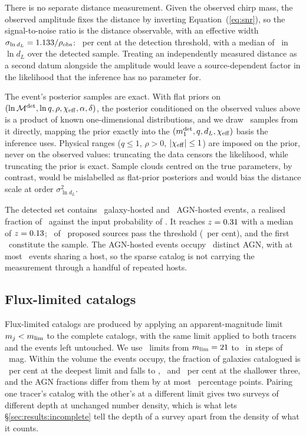 There is no separate distance measurement. Given the observed chirp mass, the
observed amplitude fixes the distance by inverting Equation~(\ref{eq:snr}), so
the signal-to-noise ratio is the distance observable, with an effective width
$\sigma_{\ln d_L} = 1.133/\rho_{\rm obs}$: \EvSigmaLnDlThresh\
per cent at the detection threshold, with a median of \EvSigmaLnDlMedian\ in
$\ln d_L$ over the detected sample. Treating an independently measured
distance as a second datum alongside the amplitude would leave a
source-dependent factor in the likelihood that the inference has no parameter
for.

The event's posterior samples are exact. With flat priors on
$(\ln \mathcal{M}^{\rm det}, \ln q, \rho, \chi_{\rm eff}, \alpha, \delta)$,
the posterior conditioned on the observed values above is a product of known
one-dimensional distributions, and we draw \EvNsamp\ samples from it directly,
mapping the prior exactly into the $(m_1^{\rm det}, q, d_L, \chi_{\rm eff})$
basis the inference uses. Physical ranges ($q \leq 1$, $\rho > 0$,
$|\chi_{\rm eff}| \leq 1$) are imposed on the prior, never on the observed
values: truncating the data censors the likelihood, while truncating the
prior is exact. Sample clouds centred on the true parameters, by contrast,
would be mislabelled as flat-prior posteriors and would bias the distance
scale at order $\sigma_{\ln d_L}^2$.

The detected set contains \EvNhostGal\ galaxy-hosted and \EvNhostAgn\
AGN-hosted events, a realised fraction of \EvFagnReal\ against the input
probability of \EvFagn. It reaches $z = 0.31$ with a median of
$z = 0.13$; \EvNdetTotal\ of \EvNproposed\ proposed sources pass the
threshold (\EvDetFrac\ per cent), and the first \EvNobs\ constitute the
sample. The AGN-hosted events occupy \EvNuniqueAgn\ distinct AGN, with at most
\EvMaxPerAgn\ events sharing a host, so the sparse catalog is not carrying the
measurement through a handful of repeated hosts.

\subsection{Flux-limited catalogs}
\label{sec:data:survey}

Flux-limited catalogs are produced by applying an apparent-magnitude limit
$m_j < m_{\rm lim}$ to the complete catalogs, with the same limit applied to
both tracers and the events left untouched. We use \MagLimN\ limits from
$m_{\rm lim} = 21$ to \MagLimShallow\ in steps of \MagLimStep\ mag.
Within the volume the events occupy, the fraction of galaxies catalogued is
\CompMTwentyOne\ per cent at the deepest limit and falls to \CompMTwenty,
\CompMNineteen\ and \CompMEighteen\ per cent at the shallower three, and the
AGN fractions differ from them by at most \CompAgnMaxDev\ percentage points.
Pairing one tracer's catalog with the other's at a different limit gives two
surveys of different depth at unchanged number density, which is what lets
\S\ref{sec:results:incomplete} tell the depth of a survey apart from the
density of what it counts.

